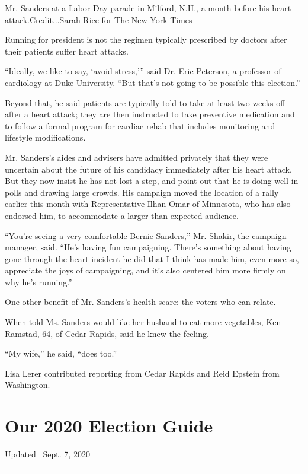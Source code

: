 Mr. Sanders at a Labor Day parade in Milford, N.H., a month before his
heart attack.Credit...Sarah Rice for The New York Times

Running for president is not the regimen typically prescribed by doctors
after their patients suffer heart attacks.

``Ideally, we like to say, `avoid stress,''' said Dr. Eric Peterson, a
professor of cardiology at Duke University. ``But that's not going to be
possible this election.''

Beyond that, he said patients are typically told to take at least two
weeks off after a heart attack; they are then instructed to take
preventive medication and to follow a formal program for cardiac rehab
that includes monitoring and lifestyle modifications.

Mr. Sanders's aides and advisers have admitted privately that they were
uncertain about the future of his candidacy immediately after his heart
attack. But they now insist he has not lost a step, and point out that
he is doing well in polls and drawing large crowds. His campaign moved
the location of a rally earlier this month with Representative Ilhan
Omar of Minnesota, who has also endorsed him, to accommodate a
larger-than-expected audience.

``You're seeing a very comfortable Bernie Sanders,'' Mr. Shakir, the
campaign manager, said. ``He's having fun campaigning. There's something
about having gone through the heart incident he did that I think has
made him, even more so, appreciate the joys of campaigning, and it's
also centered him more firmly on why he's running.''

One other benefit of Mr. Sanders's health scare: the voters who can
relate.

When told Ms. Sanders would like her husband to eat more vegetables, Ken
Ramstad, 64, of Cedar Rapids, said he knew the feeling.

``My wife,'' he said, ``does too.''

Lisa Lerer contributed reporting from Cedar Rapids and Reid Epstein from
Washington.

\hypertarget{our-2020-election-guide}{%
\section{Our 2020 Election Guide}\label{our-2020-election-guide}}

Updated ~Sept. 7, 2020

\begin{center}\rule{0.5\linewidth}{\linethickness}\end{center}

